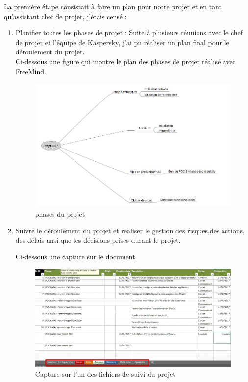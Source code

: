 \textcolor{black}{La première étape consistait à faire un plan pour notre projet et en tant qu’assistant chef de projet, j’étais censé :}
~~\\
\begin{enumerate}
    \item Planifier toutes les phases de projet : Suite à plusieurs réunions avec le chef de projet et l’équipe de Kaspersky, j’ai pu réaliser un plan final pour le déroulement du projet.
~~\\
\textcolor{black}{Ci-dessous une figure qui montre le plan des phases de projet réalisé avec FreeMind.}
\begin{figure}[H]
	\begin{center}
		\includegraphics[width=1\linewidth]{Projet_KATA/freeMind}
\end{center}
	\caption{phases du projet}
	\label{fig:4}	
\end{figure}
		 
\item Suivre le déroulement du projet et réaliser le gestion des risques,des actions, des délais ansi que les décisions prises durant le projet. 

\textcolor{black}{Ci-dessous une capture sur le document.}
\begin{figure}[H]
	\begin{center}
		\includegraphics[width=1\linewidth]{Projet_KATA/suiviExcel}
\end{center}
	\caption{Capture sur l'un des fichiers de suivi du projet}
	\label{fig:5}	
\end{figure}
		 

\end{enumerate}
